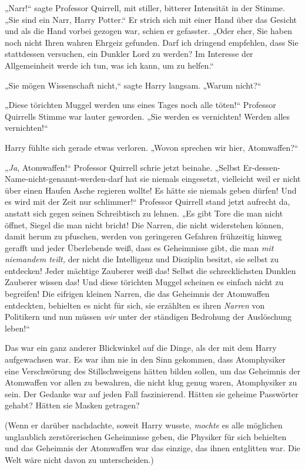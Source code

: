 {„Narr!“ sagte Professor Quirrell, mit stiller, bitterer Intensität in der Stimme. „Sie sind ein Narr, Harry Potter.“ Er strich sich mit einer Hand über das Gesicht und als die Hand vorbei gezogen war, schien er gefasster. „Oder eher, Sie haben noch nicht Ihren wahren Ehrgeiz gefunden. Darf ich dringend empfehlen, dass Sie stattdessen versuchen, ein Dunkler Lord zu werden? Im Interesse der Allgemeinheit werde ich tun, was ich kann, um zu helfen.“

„Sie mögen Wissenschaft nicht,“ sagte Harry langsam. „Warum nicht?“

„Diese törichten Muggel werden uns eines Tages noch alle töten!“ Professor Quirrells Stimme war lauter geworden. „Sie werden es vernichten! Werden alles vernichten!“

Harry fühlte sich gerade etwas verloren. „Wovon sprechen wir hier, Atomwaffen?“

„\emph{Ja}, Atomwaffen!“ Professor Quirrell schrie jetzt beinahe. „Selbst Er-dessen-Name-nicht-genannt-werden-darf hat sie niemals eingesetzt, vielleicht weil er nicht über einen Haufen Asche regieren wollte! Es hätte sie niemals geben dürfen! Und es wird mit der Zeit nur schlimmer!“ Professor Quirrell stand jetzt aufrecht da, anstatt sich gegen seinen Schreibtisch zu lehnen. „Es gibt Tore die man nicht öffnet, Siegel die man nicht bricht! Die Narren, die nicht widerstehen können, damit herum zu pfuschen, werden von geringeren Gefahren frühzeitig hinweg gerafft und jeder Überlebende weiß, dass es Geheimnisse gibt, die man \emph{mit niemandem teilt,} der nicht die Intelligenz und Disziplin besitzt, sie selbst zu entdecken! Jeder mächtige Zauberer weiß das! Selbst die schrecklichsten Dunklen Zauberer wissen das! Und diese törichten Muggel scheinen es einfach nicht zu begreifen! Die eifrigen kleinen Narren, die das Geheimnis der Atomwaffen entdeckten, behielten es nicht für sich, sie erzählten es ihren \emph{Narren} von Politikern und nun müssen \emph{wir} unter der ständigen Bedrohung der Auslöschung leben!“

Das war ein ganz anderer Blickwinkel auf die Dinge, als der mit dem Harry aufgewachsen war. Es war ihm nie in den Sinn gekommen, dass Atomphysiker eine Verschwörung des Stillschweigens hätten bilden sollen, um das Geheimnis der Atomwaffen vor allen zu bewahren, die nicht klug genug waren, Atomphysiker zu sein. Der Gedanke war auf jeden Fall faszinierend. Hätten sie geheime Passwörter gehabt? Hätten sie Masken getragen?

(Wenn er darüber nachdachte, soweit Harry wusste, \emph{mochte} es alle möglichen unglaublich zerstörerischen Geheimnisse geben, die Physiker für sich behielten und das Geheimnis der Atomwaffen war das einzige, das ihnen entglitten war. Die Welt wäre nicht davon zu unterscheiden.)

}
